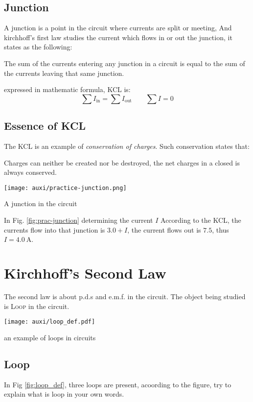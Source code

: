 \documentclass[a4paper]{tufte-handout}
\newenvironment{ExampleBox} %
{\begin{tcolorbox}[breakable,colback=g1!30,colframe=g1,title=Example]} {\end{tcolorbox}}
\newenvironment{SummBox}
{\begin{tcolorbox}[breakable,colback=r1!30,colframe=r1,title=Summary]} {\end{tcolorbox}}
\begin{document}
\subsection{Junction}
A junction is a point in the circuit where currents are split or meeting, And kirchhoff's first law studies the current which flows in or out the junction, it states as the following:
\begin{SummBox}
The sum of the currents entering any junction in a circuit is equal to the sum of the currents leaving that same junction.

expressed in mathematic formula, KCL is:
\[
  \sum I_{\text{in}} = \sum I_{\text{out}}  \qquad \sum I = 0 
\]
\end{SummBox}

\subsection{Essence of KCL}
The KCL is an example of \emph{conservation of charges}. Such conservation states that:
\begin{SummBox}
Charges can neither be created nor be destroyed, the net charges in a closed is always conserved.
\end{SummBox}

\begin{marginfigure}
\texttt{[image: auxi/practice-junction.png]}
\caption{A junction in the circuit}
\label{fig:prac-junction}
\end{marginfigure}

\begin{ExampleBox}
In Fig. \ref{fig:prac-junction} determining the current $I$
\tcblower
According to the KCL, the currents flow into that junction is $3.0+I$, the current flows out is $7.5$, thus $I=\SI{4.0}{\A}$.
\end{ExampleBox}

\section{Kirchhoff's Second Law}
The second law is about p.d.s and e.m.f. in the circuit. The object being studied is \textcolor{r1}{\textsc{Loop}} in the circuit.
\begin{marginfigure}
\centering
\texttt{[image: auxi/loop\_def.pdf]}
\caption{an example of loops in circuits}
\label{fig:loop_def}
\end{marginfigure}

\subsection{Loop}
In Fig \ref{fig:loop_def}, three loops are present, acoording to the figure, try to explain what is loop in your own words.
\end{document}
